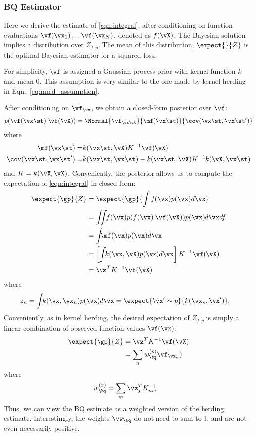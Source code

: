 \subsubsection{ BQ Estimator}

Here we derive the \bq{} estimate of \eqref{eqn:integral}, after conditioning on function evaluations $\vf(\vx_1) \dots \vf(\vx_N)$, denoted as $f(\vX)$.  The Bayesian solution implies a distribution over $Z_{f,p}$.  The mean of this distribution, $\expect{}{Z}$ is the optimal Bayesian estimator for a squared loss.

For simplicity, $\vf$ is assigned a Gaussian process prior with kernel function $k$ and mean $0$.  This assumption is very similar to the one made by kernel herding in Eqn.\ \eqref{eq:mmd_assumption}.

After conditioning on $\vf_{\vx}$, we obtain a closed-form posterior over $\vf$:
%
\begin{align}
p(\vf(\vx\st)|\vf(\vX)) = \Normal{\vf_{\vx\st}}{\mf(\vx\st)}{\cov(\vx\st,\vx\st')}
\end{align} 
where
\begin{align}
\mf(\vx\st) = & k(\vx\st, \vX) K^{-1} \vf(\vX) \\
\cov(\vx\st, \vx\st') = & k(\vx\st,\vx\st) - k(\vx\st, \vX) K^{-1} k(\vX, \vx\st)
\end{align} 
%
and $K = k(\vX, \vX)$. 
%
Conveniently, the \gp{} posterior allows us to compute the expectation of \eqref{eqn:integral} in closed form: 
%
\begin{align}
\expect{\gp}{Z} & = \expect{\gp}{\int f(\vx)p(\vx)d\vx}\\
 & = \int\!\!\! \int\!\! f(\vx) p(f(\vx)|\vf(\vX)) p(\vx) d\vx df\\
 & = \int\!\!\! \mf(\vx) p(\vx) d\vx \\
 & = \left[ \int\!\! k(\vx, \vX) p(\vx) d\vx \right] K^{-1} \vf(\vX) \\
 & = \vz^T K^{-1} \vf(\vX)
\label{eq:marg_mean_symbolic}
\end{align} 
where
\begin{align}
z_n & = \int\!\! k(\vx, \vx_n) p(\vx) d\vx = \expect{\vx' \sim p}{k(\vx_n, \vx')}.
\end{align}
%
Conveniently, as in kernel herding, the desired expectation of $Z_{f,p}$ is simply a linear combination of observed function values $\vf(\vx)$:
%
\begin{align}
\expect{\gp}{Z} & = \vz^T K^{-1} \vf(\vX) \\
    & = \sum_n w_{\bq}^{(n)} \vf_{\vx_n})
\end{align}  
where
\begin{align}  
w_{\bq}^{(n)} & = \sum_m \vz_j^T K^{-1}_{nm}
\label{eq:bq_weights}
\end{align}
%
Thus, we can view the BQ estimate as a weighted version of the herding estimate.  Interestingly, the weights $\vw_{\bq}$ do not need to sum to 1, and are not even necessarily positive.

